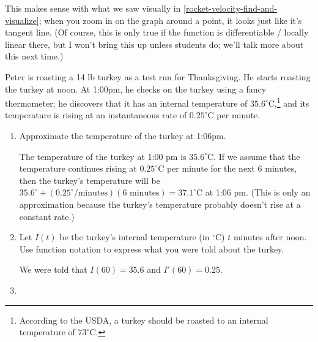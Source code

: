 \documentclass{article}
\begin{document}
\begin{enumerate}[resume]
{    This makes sense with what we saw visually in \ref{rocket-velocity-find-and-visualize}; when you zoom in on the graph around a point, it looks just like it's tangent line. (Of course, this is only true if the function is differentiable / locally linear there, but I won't bring this up unless students do; we'll talk more about this next time.)}

  Peter is roasting a 14 lb turkey as a test run for Thanksgiving. He starts roasting the turkey at noon. At 1:00pm, he checks on the turkey using a fancy thermometer; he discovers that it has an internal temperature of $35.6^\circ$C,\footnote{According to the USDA, a turkey should be roasted to an internal temperature of $73^\circ$C.} and its temperature is rising at an instantaneous rate of $0.25^\circ$C per minute.

  \begin{enumerate}
  \item \label{linear-approximation-turkey-approx}
    \begin{problem}[\vfill]
      Approximate the temperature of the turkey at 1:06pm.
    \end{problem}

    \begin{solution}
      The temperature of the turkey at 1:00 pm is $35.6^\circ$C. If we assume that the temperature continues rising at $0.25^\circ$C per minute for the next 6 minutes, then the turkey's temperature will be $35.6^\circ + (0.25^\circ / \text{minutes})(6 \text{ minutes}) = \boxed{37.1^\circ\text{C}}$ at 1:06 pm. (This is only an approximation because the turkey's temperature probably doesn't rise at a constant rate.)
    \end{solution}

  \item
    \begin{problem}[\vfill]
      Let $I(t)$ be the turkey's internal temperature (in $^\circ$C) $t$ minutes after noon. Use function notation to express what you were told about the turkey.
    \end{problem}

    \begin{solution}
      We were told that $I(60) = 35.6$ and $I'(60) = 0.25$. 
    \end{solution}

  \item



\end{enumerate}
\end{enumerate}
\end{document}
